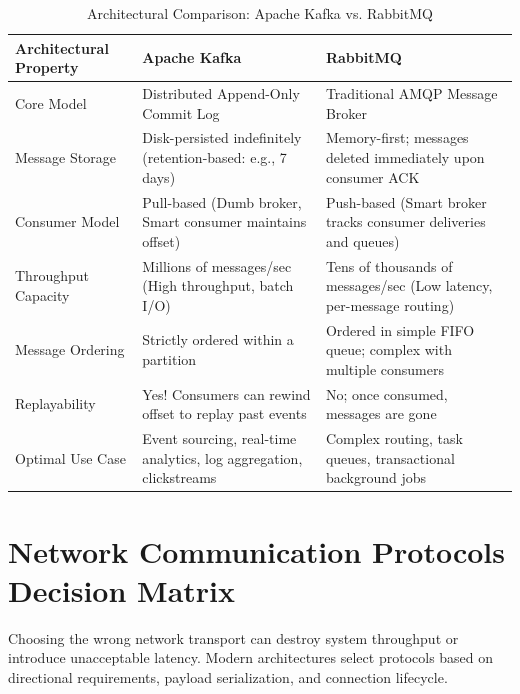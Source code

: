 \documentclass[10pt,journal,compsoc,onecolumn]{IEEEtran}
\begin{document}
\begin{table}[htbp]
\caption{Architectural Comparison: Apache Kafka vs. RabbitMQ}
\label{tab:mq_comparison}
\centering
\begin{tabular}{p{3.2cm}p{5.0cm}p{5.0cm}}
\toprule
\textbf{Architectural Property} & \textbf{Apache Kafka} & \textbf{RabbitMQ} \\
\midrule
Core Model & Distributed Append-Only Commit Log & Traditional AMQP Message Broker \\
Message Storage & Disk-persisted indefinitely (retention-based: e.g., 7 days) & Memory-first; messages deleted immediately upon consumer ACK \\
Consumer Model & Pull-based (Dumb broker, Smart consumer maintains offset) & Push-based (Smart broker tracks consumer deliveries and queues) \\
Throughput Capacity & Millions of messages/sec (High throughput, batch I/O) & Tens of thousands of messages/sec (Low latency, per-message routing) \\
Message Ordering & Strictly ordered within a partition & Ordered in simple FIFO queue; complex with multiple consumers \\
Replayability & Yes! Consumers can rewind offset to replay past events & No; once consumed, messages are gone \\
Optimal Use Case & Event sourcing, real-time analytics, log aggregation, clickstreams & Complex routing, task queues, transactional background jobs \\
\bottomrule
\end{tabular}
\end{table}

\section{Network Communication Protocols Decision Matrix}
\label{sec:network_protocols}

Choosing the wrong network transport can destroy system throughput or introduce unacceptable latency. Modern architectures select protocols based on directional requirements, payload serialization, and connection lifecycle.
\end{document}
